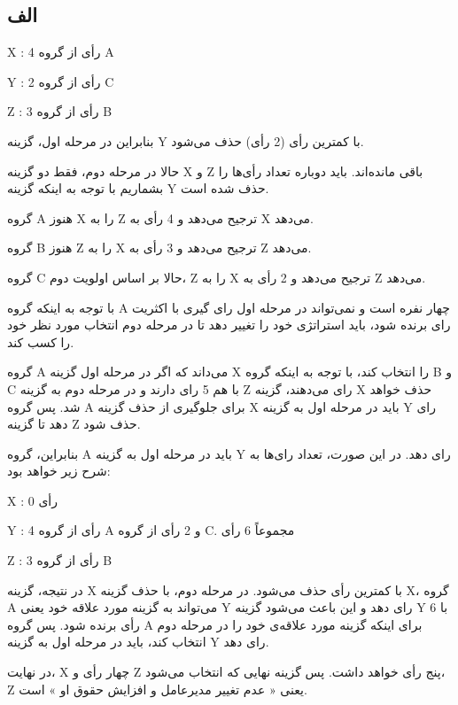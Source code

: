 \subsection*{الف}


X : 4 رأی از گروه A


Y : 2 رأی از گروه C


Z : 3 رأی از گروه B


بنابراین در مرحله اول، گزینه Y با کمترین رأی (2 رأی) حذف می‌شود.


حالا در مرحله دوم، فقط دو گزینه X و Z باقی مانده‌اند. باید دوباره تعداد رأی‌ها را بشماریم با توجه به اینکه گزینه Y حذف شده است.


گروه A هنوز X را به Z ترجیح می‌دهد و 4 رأی به X می‌دهد.


گروه B هنوز Z را به X ترجیح می‌دهد و 3 رأی به Z می‌دهد.


گروه C حالا بر اساس اولویت دوم، Z را به X ترجیح می‌دهد و 2 رأی به Z می‌دهد.


با توجه به اینکه گروه A چهار نفره است و نمی‌تواند در مرحله اول رای گیری با اکثریت رای برنده شود، باید استراتژی خود را تغییر دهد تا در مرحله دوم انتخاب مورد نظر خود را کسب کند.


گروه A می‌داند که اگر در مرحله اول گزینه X را انتخاب کند، با توجه به اینکه گروه B و C با هم 5 رای دارند و در مرحله دوم به گزینه Z رای می‌دهند، گزینه X حذف خواهد شد. پس گروه A برای جلوگیری از حذف گزینه X باید در مرحله اول به گزینه Y رای دهد تا گزینه Z حذف شود.


بنابراین، گروه A باید در مرحله اول به گزینه Y رای دهد. در این صورت، تعداد رای‌ها به شرح زیر خواهد بود:


X : 0 رأی


Y : 4 رأی از گروه A و 2 رأی از گروه C. مجموعاً 6 رأی


Z : 3 رأی از گروه B


در نتیجه، گزینه X با کمترین رأی حذف می‌شود. در مرحله دوم، با حذف گزینه X، گروه A می‌تواند به گزینه مورد علاقه خود یعنی Y رای دهد و این باعث می‌شود گزینه Y با 6 رأی برنده شود. پس گروه A برای اینکه گزینه مورد علاقه‌ی خود را در مرحله دوم انتخاب کند، باید در مرحله اول به گزینه Y رای دهد.


در نهایت، X چهار رأی و Z پنج رأی خواهد داشت. پس گزینه نهایی که انتخاب می‌شود، Z یعنی « عدم تغییر مدیرعامل و افزایش حقوق او » است.